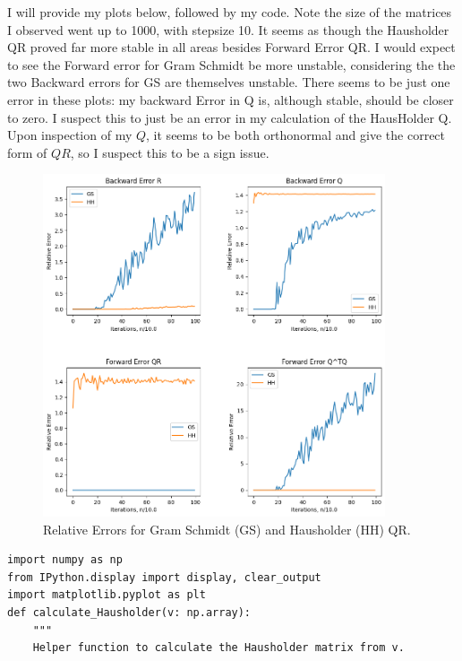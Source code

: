 \partbreak
\begin{solution}

    I will provide my plots below, followed by my code. Note the size of the matrices I observed went up to 1000, with stepsize 10. It seems as though the Hausholder QR proved far more stable in all areas besides Forward Error QR. I would expect to see the Forward error for Gram Schmidt be more unstable, considering the the two Backward errors for GS are themselves unstable. There seems to be just one error in these plots: my backward Error in Q is, although stable, should be closer to zero. I suspect this to just be an error in my calculation of the HausHolder Q. Upon inspection of my $Q$, it seems to be both orthonormal and give the correct form of $QR$, so I suspect this to be a sign issue.

    \begin{figure}[ht]
        \centering
        \includegraphics[width = 0.9\textwidth]{Images/problem6d MC3.png}
        \caption{Relative Errors for Gram Schmidt (GS) and Hausholder (HH) QR.}
        \label{fig:enter-label}
    \end{figure}

\clearpage
\begin{lstlisting}
import numpy as np
from IPython.display import display, clear_output
import matplotlib.pyplot as plt
def calculate_Hausholder(v: np.array):
    """
    Helper function to calculate the Hausholder matrix from v.
    

\end{lstlisting}
\end{solution}
